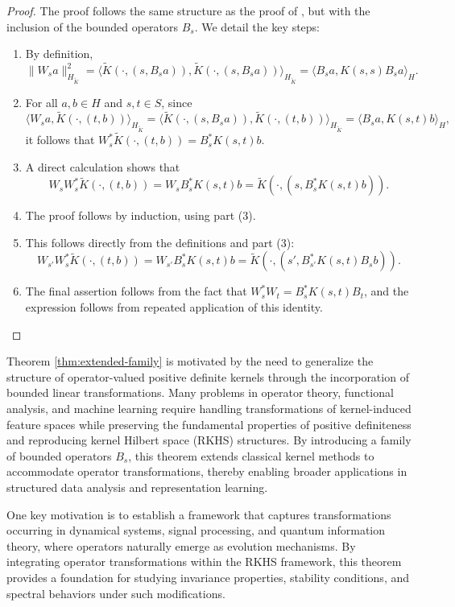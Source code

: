 \documentclass[11pt]{amsart}
\theoremstyle{definition}
\numberwithin{equation}{section}
\begin{document}
\begin{proof}
The proof follows the same structure as the proof of \cite[Theorem 3.1]{Jorgensen2024}, but with the inclusion of the bounded operators \( B_s \). We detail the key steps:
\begin{enumerate}
    \item By definition,
    \[
    \|W_s a\|_{H_{\tilde{K}}}^2 = \langle \tilde{K}(\cdot, (s, B_s a)), \tilde{K}(\cdot, (s, B_s a)) \rangle_{H_{\tilde{K}}} = \langle B_s a, K(s,s) B_s a \rangle_H.
    \]
    \item For all \( a, b \in H \) and \( s, t \in S \), since
    \[
    \langle W_s a, \tilde{K}(\cdot, (t,b)) \rangle_{H_{\tilde{K}}} = \langle \tilde{K}(\cdot, (s, B_s a)), \tilde{K}(\cdot, (t,b)) \rangle_{H_{\tilde{K}}} = \langle B_s a, K(s,t) b \rangle_H,
    \]
    it follows that \( W_s^* \tilde{K}(\cdot, (t,b)) = B_s^* K(s,t) b \).
    \item A direct calculation shows that
    \[
    W_s W_s^* \tilde{K}(\cdot, (t,b)) = W_s B_s^* K(s,t) b = \tilde{K}(\cdot, (s, B_s^* K(s,t) b)).
    \]
    \item The proof follows by induction, using part (3).
    \item This follows directly from the definitions and part (3):
    \[
    W_{s'} W_s^* \tilde{K}(\cdot, (t,b)) = W_{s'} B_s^* K(s,t) b = \tilde{K}(\cdot, (s', B_{s'}^* K(s,t) B_s b)).
    \]
    \item The final assertion follows from the fact that \( W_s^* W_t = B_s^* K(s,t) B_t \), and the expression follows from repeated application of this identity.
\end{enumerate}
\end{proof}
Theorem \ref{thm:extended-family} is motivated by the need to generalize the structure of operator-valued positive definite kernels through the incorporation of bounded linear transformations. Many problems in operator theory, functional analysis, and machine learning require handling transformations of kernel-induced feature spaces while preserving the fundamental properties of positive definiteness and reproducing kernel Hilbert space (RKHS) structures. By introducing a family of bounded operators $B_s$, this theorem extends classical kernel methods to accommodate operator transformations, thereby enabling broader applications in structured data analysis and representation learning.

One key motivation is to establish a framework that captures transformations occurring in dynamical systems, signal processing, and quantum information theory, where operators naturally emerge as evolution mechanisms. By integrating operator transformations within the RKHS framework, this theorem provides a foundation for studying invariance properties, stability conditions, and spectral behaviors under such modifications.\\
\end{document}

